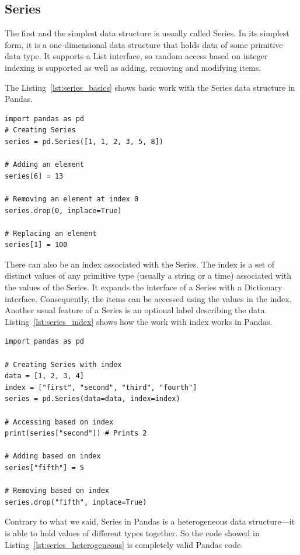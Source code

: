 \subsection{Series}

The first and the simplest data structure is usually called Series.
In its simplest form, it is a one-dimensional data structure that holds data of some primitive data type.
It supports a List interface, so random access based on integer indexing is supported as well as adding, removing and
modifying items.

The Listing~\ref{lst:series_basics} shows basic work with the Series data structure in Pandas.

\begin{lstlisting}[caption=Working with Series in Pandas, label={lst:series_basics}, captionpos=b]
import pandas as pd
# Creating Series
series = pd.Series([1, 1, 2, 3, 5, 8])

# Adding an element
series[6] = 13

# Removing an element at index 0
series.drop(0, inplace=True)

# Replacing an element
series[1] = 100
\end{lstlisting}

There can also be an index associated with the Series.
The index is a set of distinct values of any primitive type (usually a string or a time) associated with the values of
the Series.
It expands the interface of a Series with a Dictionary interface.
Consequently, the items can be accessed using the values in the index.
Another usual feature of a Series is an optional label describing the data.
Listing~\ref{lst:series_index} shows how the work with index works in Pandas.

\begin{lstlisting}[caption=Index on a Series, label={lst:series_index}, captionpos=b]
import pandas as pd

# Creating Series with index
data = [1, 2, 3, 4]
index = ["first", "second", "third", "fourth"]
series = pd.Series(data=data, index=index)

# Accessing based on index
print(series["second"]) # Prints 2

# Adding based on index
series["fifth"] = 5

# Removing based on index
series.drop("fifth", inplace=True)

\end{lstlisting}

Contrary to what we said, Series in Pandas is a heterogeneous data structure---it is able to hold values of different
types together.
So the code showed in Listing~\ref{lst:series_heterogeneous} is completely valid Pandas code.

